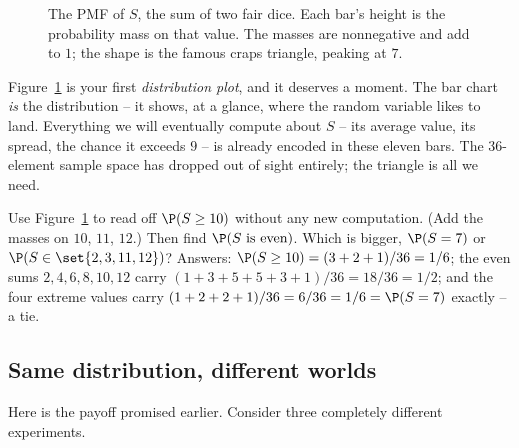 \begin{figure}[H]
\centering
{}
\caption{The PMF of $S$, the sum of two fair dice. Each bar's height is the
probability mass on that value. The masses are nonnegative and add to $1$; the shape
is the famous craps triangle, peaking at $7$.}
\label{ch06:fig-dice-pmf}
\end{figure}

Figure~\ref{ch06:fig-dice-pmf} is your first \emph{distribution plot}, and it deserves
a moment. The bar chart \emph{is} the distribution -- it shows, at a glance, where the
random variable likes to land. Everything we will eventually compute about $S$ -- its
average value, its spread, the chance it exceeds $9$ -- is already encoded in these
eleven bars. The $36$-element sample space has dropped out of sight entirely; the
triangle is all we need.

\begin{walkbox}
Use Figure~\ref{ch06:fig-dice-pmf} to read off $\P(S \ge 10)$ without any new
computation. (Add the masses on $10$, $11$, $12$.) Then find $\P(S \text{ is even})$.
Which is bigger, $\P(S = 7)$ or $\P(S \in \set{2,3,11,12})$? Answers:
$\P(S \ge 10) = (3+2+1)/36 = 1/6$; the even sums $2,4,6,8,10,12$ carry
$(1+3+5+5+3+1)/36 = 18/36 = 1/2$; and the four extreme values carry
$(1+2+2+1)/36 = 6/36 = 1/6 = \P(S=7)$ exactly -- a tie.
\end{walkbox}

\subsection{Same distribution, different worlds}

Here is the payoff promised earlier. Consider three completely different experiments.

